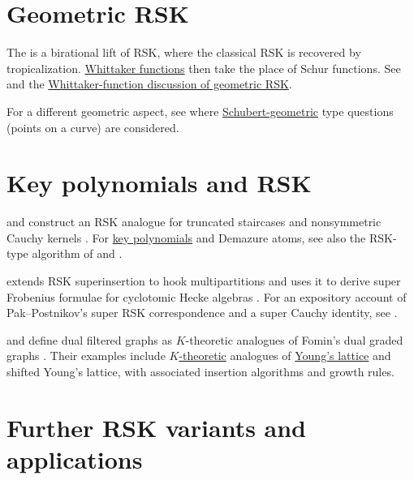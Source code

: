 \section[geometricRSK]{Geometric RSK}

The \label{geometricRSKCorrespondence} is
a birational lift of RSK, where
the classical RSK is recovered by tropicalization.
\hyperref[whittaker]{Whittaker functions} then take the place of Schur
functions.
See \cite{CorwinOConnellSeppalainenZygouras2014} and the
\hyperref[geometricWhittaker]{Whittaker-function discussion of geometric RSK}.


For a different geometric aspect, see \cite{GillespieReimerBerg2023}
where \hyperref[schubertCalculus]{Schubert-geometric} type questions
(points on a curve) are considered.


\section[nonsymmetricRSK]{Key polynomials and RSK}


 and  construct an RSK analogue for
truncated staircases and nonsymmetric Cauchy kernels
\cite{AzenhasEmami2015}.  For \hyperref[key]{key polynomials} and Demazure
atoms, see also
the RSK-type algorithm of  and 
\cite{AssafQuijada2019x}.

 extends RSK superinsertion to hook multipartitions and uses
it to derive super Frobenius formulae for cyclotomic Hecke algebras
\cite{Zhao2019x}.  For an expository account of Pak--Postnikov's super RSK
correspondence and a super Cauchy identity, see \cite{Rowan2014SuperRSK}.

 and  define dual filtered
graphs as $K$-theoretic analogues of Fomin's dual graded graphs
\cite{PatriasPylyavskyy2014x}.  Their examples include
\hyperref[kTheory]{$K$-theoretic} analogues of
\hyperref[posets]{Young's lattice} and shifted Young's lattice, with associated
insertion algorithms and growth rules.



\section[otherRSK]{Further RSK variants and applications}

